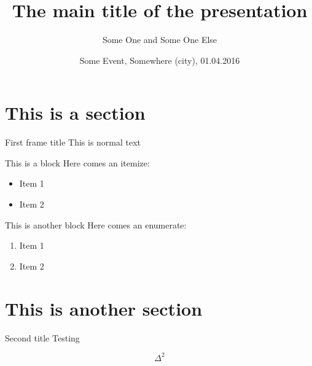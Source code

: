 \documentclass[]{rsuqbeamernew}
\title[Small Title Footer]{The main title of the presentation}
\author[S. One - S. One Else]
{Some One and Some One Else}
\institute[RSUQ, ETH Z\"urich]{Chair of Risk, Safety and Uncertainty 
Quantification -- ETH Z\"urich}
\date[01.04.2016]
{\small  Some Event, Somewhere (city), 01.04.2016}
\begin{document}
\section{This is a section}

\secoutline

\begin{frame}{First frame title}
	This is normal text\\
	
	
	\begin{block}{This is a block}
		Here comes an itemize:
		\begin{itemize}
			\item Item 1
			\item Item 2
		\end{itemize}
	\end{block}
	\begin{block}{This is another block}
		Here comes an enumerate:
		\begin{enumerate}
			\item Item 1
			\item Item 2
		\end{enumerate}
	\end{block}

	
\end{frame}


\section{This is another section}
\secoutline


\begin{frame}{Second title}
Testing 

\begin{equation}
\Delta^2
\end{equation}


\end{frame}
\end{document}
